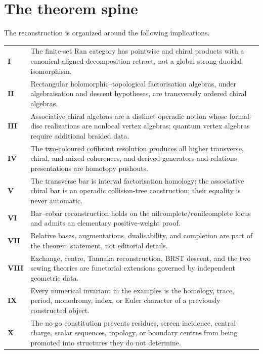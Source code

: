 \chapter*{The theorem spine}
The reconstruction is organized around the following implications.
\begin{longtable}{p{}p{}}
\toprule
\textbf{I} & The finite-set Ran category has pointwise and chiral products with a canonical aligned-decomposition retract, not a global strong-duoidal isomorphism.\\
\textbf{II} & Rectangular holomorphic--topological factorisation algebras, under algebraisation and descent hypotheses, are transversely ordered chiral algebras.\\
\textbf{III} & Associative chiral algebras are a distinct operadic notion whose formal-disc realizations are nonlocal vertex algebras; quantum vertex algebras require additional braided data.\\
\textbf{IV} & The two-coloured cofibrant resolution produces all higher transverse, chiral, and mixed coherences, and derived generators-and-relations presentations are homotopy pushouts.\\
\textbf{V} & The transverse bar is interval factorisation homology; the associative chiral bar is an operadic collision-tree construction; their equality is never automatic.\\
\textbf{VI} & Bar--cobar reconstruction holds on the nilcomplete/conilcomplete locus and admits an elementary positive-weight proof.\\
\textbf{VII} & Relative bases, augmentations, dualisability, and completion are part of the theorem statement, not editorial details.\\
\textbf{VIII} & Exchange, centre, Tannaka reconstruction, BRST descent, and the two sewing theories are functorial extensions governed by independent geometric data.\\
\textbf{IX} & Every numerical invariant in the examples is the homology, trace, period, monodromy, index, or Euler character of a previously constructed object.\\
\textbf{X} & The no-go constitution prevents residues, screen incidence, central charge, scalar sequences, topology, or boundary centres from being promoted into structures they do not determine.\\
\bottomrule
\end{longtable}

